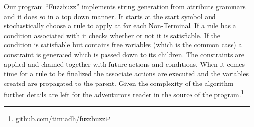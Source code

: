 Our program ``Fuzzbuzz'' implements string generation from attribute grammars
and it does so in a top down manner. It starts at the start symbol and
stochastically choose a rule to apply at for each Non-Terminal. If a rule has a
condition associated with it checks whether or not it is satisfiable. If the
condition is satisfiable but contains free variables (which is the common case)
a constraint is generated which is passed down to its children. The constraints
are applied and chained together with future actions and conditions. When it
comes time for a rule to be finalized the associate actions are executed and the
variables created are propagated to the parent. Given the complexity of the
algorithm further details are left for the adventurous reader in the source of
the program.\footnote{github.com/timtadh/fuzzbuzz}

